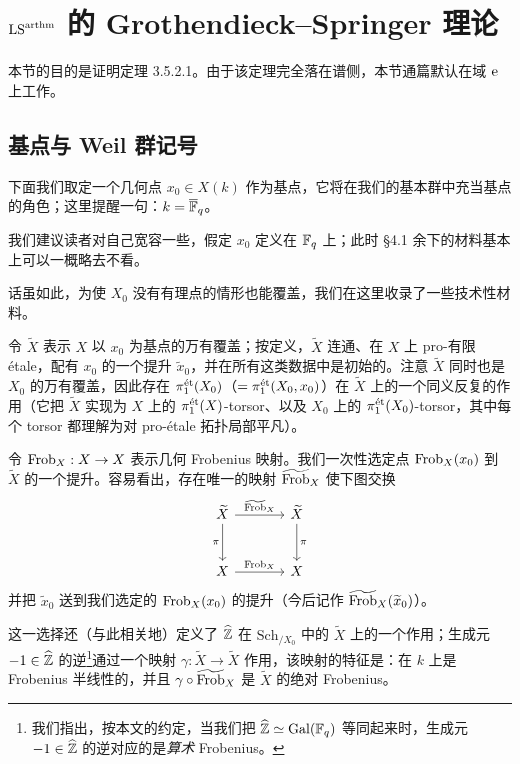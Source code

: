 \section{$\LS^{\arthm}$ 的 Grothendieck--Springer 理论}

本节的目的是证明定理 3.5.2.1。由于该定理完全落在谱侧，本节通篇默认在域 $\e$ 上工作。

\subsection{基点与 Weil 群记号}

下面我们取定一个几何点 $x_0 \in X(k)$ 作为基点，它将在我们的基本群中充当基点的角色；这里提醒一句：$k = \Fb$。

我们建议读者对自己宽容一些，假定 $x_0$ 定义在 $\F_q$ 上；此时 §4.1 余下的材料基本上可以一概略去不看。

话虽如此，为使 $X_0$ 没有有理点的情形也能覆盖，我们在这里收录了一些技术性材料。

\pnum{}令 $\widetilde{X}$ 表示 $X$ 以 $x_0$ 为基点的万有覆盖；按定义，$\widetilde{X}$ 连通、在 $X$ 上 pro-有限 étale，配有 $x_0$ 的一个提升 $\widetilde{x}_0$，并在所有这类数据中是初始的。注意 $\widetilde{X}$ 同时也是 $X_0$ 的万有覆盖，因此存在 $\pi_1^{\et}(X_0)$（$= \pi_1^{\et}(X_0,x_0)$）在 $\widetilde{X}$ 上的一个同义反复的作用（它把 $\widetilde{X}$ 实现为 $X$ 上的 $\pi_1^{\et}(X)$-torsor、以及 $X_0$ 上的 $\pi_1^{\et}(X_0)$-torsor，其中每个 torsor 都理解为对 pro-étale 拓扑局部平凡）。

令 $\Frob_X : X \to X$ 表示几何 Frobenius 映射。我们一次性选定点 $\Frob_X(x_0)$ 到 $\widetilde{X}$ 的一个提升。容易看出，存在唯一的映射 $\widetilde{\Frob}_X$ 使下图交换
\[
\begin{tikzcd}[column sep=large, row sep=large]
  \widetilde{X} \arrow[r, "\widetilde{\Frob}_X"] \arrow[d, "\pi"'] & \widetilde{X} \arrow[d, "\pi"] \\
  X \arrow[r, "\Frob_X"] & X
\end{tikzcd}
\]
并把 $\widetilde{x}_0$ 送到我们选定的 $\Frob_X(x_0)$ 的提升（今后记作 $\widetilde{\Frob}_X(\widetilde{x}_0)$）。

这一选择还（与此相关地）定义了 $\widehat{\ZZ}$ 在 $\mathrm{Sch}_{/X_0}$ 中的 $\widetilde{X}$ 上的一个作用；生成元 $-1 \in \widehat{\ZZ}$ 的逆\footnote{我们指出，按本文的约定，当我们把 $\widehat{\ZZ} \simeq \mathrm{Gal}(\F_q)$ 等同起来时，生成元 $-1 \in \widehat{\ZZ}$ 的逆对应的是\emph{算术} Frobenius。}通过一个映射 $\gamma : \widetilde{X} \to \widetilde{X}$ 作用，该映射的特征是：在 $k$ 上是 Frobenius 半线性的，并且 $\gamma \circ \widetilde{\Frob}_X$ 是 $\widetilde{X}$ 的绝对 Frobenius。

